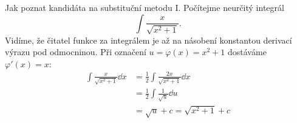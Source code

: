 \begin{mdframed}[style=mdexam]
  \begin{example}\label{MAI:exam110}
    Jak poznat kandidáta na substituční metodu I. Počítejme neurčitý integrál 
    \begin{equation*}
      \int\frac{x}{\sqrt{x^2+1}}.
    \end{equation*} 
    Vidíme, že čitatel funkce za integrálem je až na násobení konstantou derivací výrazu pod
    odmocninou. Při označení \(u=\varphi(x) = x^2 + 1\) dostáváme \(\varphi'(x) = x\):
    \begin{align*}
      \int\frac{x}{\sqrt{x^2+1}}\dd{x} 
        &= \frac{1}{2}\int\frac{2x}{\sqrt{x^2+1}}\dd{x} \\
        &= \frac{1}{2}\int\frac{1}{\sqrt{u}}\dd{u}      \\    
        &= \sqrt{u} + c = \sqrt{x^2 + 1} + c  
    \end{align*}
  \end{example}
\end{mdframed}